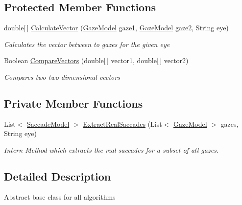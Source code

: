 \subsection*{Protected Member Functions}
\begin{DoxyCompactItemize}
\item 
double\mbox{[}$\,$\mbox{]} \hyperlink{class_web_analyzer_1_1_models_1_1_algorithm_model_1_1_algorithm_afbd5e3a6eb4bbcd142f6934ba6026b3b}{Calculate\+Vector} (\hyperlink{class_web_analyzer_1_1_models_1_1_data_model_1_1_gaze_model}{Gaze\+Model} gaze1, \hyperlink{class_web_analyzer_1_1_models_1_1_data_model_1_1_gaze_model}{Gaze\+Model} gaze2, String eye)
\begin{DoxyCompactList}\small\item\em Calculates the vector between to gazes for the given eye \end{DoxyCompactList}\item 
Boolean \hyperlink{class_web_analyzer_1_1_models_1_1_algorithm_model_1_1_algorithm_a4a2a618988f6a538ed55deee35243ee4}{Compare\+Vectors} (double\mbox{[}$\,$\mbox{]} vector1, double\mbox{[}$\,$\mbox{]} vector2)
\begin{DoxyCompactList}\small\item\em Compares two two dimensional vectors \end{DoxyCompactList}\end{DoxyCompactItemize}
\subsection*{Private Member Functions}
\begin{DoxyCompactItemize}
\item 
List$<$ \hyperlink{class_web_analyzer_1_1_models_1_1_analysis_model_1_1_saccade_model}{Saccade\+Model} $>$ \hyperlink{class_web_analyzer_1_1_models_1_1_algorithm_model_1_1_algorithm_a3ac55aacffefb5f2459f6b43b44a595b}{Extract\+Real\+Saccades} (List$<$ \hyperlink{class_web_analyzer_1_1_models_1_1_data_model_1_1_gaze_model}{Gaze\+Model} $>$ gazes, String eye)
\begin{DoxyCompactList}\small\item\em Intern Method which extracts the real saccades for a subset of all gazes. \end{DoxyCompactList}\end{DoxyCompactItemize}


\subsection{Detailed Description}
Abstract base class for all algorithms 



